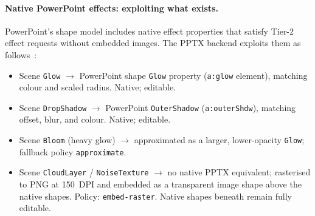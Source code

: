 \paragraph{Native PowerPoint effects: exploiting what exists.}
PowerPoint's shape model includes native effect properties that satisfy Tier-2 effect
requests without embedded images. The PPTX backend exploits them as follows~\cite{ooxml}:

\begin{itemize}
  \item Scene \texttt{Glow} $\to$ PowerPoint shape \texttt{Glow} property
        (\texttt{a:glow} element), matching colour and scaled radius. Native; editable.
  \item Scene \texttt{DropShadow} $\to$ PowerPoint \texttt{OuterShadow}
        (\texttt{a:outerShdw}), matching offset, blur, and colour. Native; editable.
  \item Scene \texttt{Bloom} (heavy glow) $\to$ approximated as a larger, lower-opacity
        \texttt{Glow}; fallback policy \texttt{approximate}.
  \item Scene \texttt{CloudLayer} / \texttt{NoiseTexture} $\to$ no native PPTX
        equivalent; rasterised to PNG at 150~DPI and embedded as a transparent image shape
        above the native shapes. Policy: \texttt{embed-raster}. Native shapes beneath
        remain fully editable.
\end{itemize}

